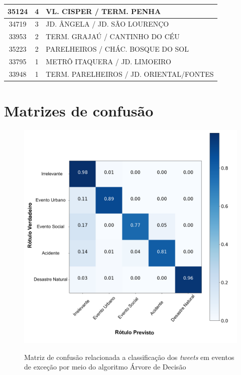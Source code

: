 \documentclass[
	12pt,				%
	oneside,			%
	a4paper,			%
	english,			%
	brazil				%
	]{abntex2ppgsi}
\begin{document}
{{\begin{apendicesenv}
\begin{longtable}{c|c|p{7cm}}
    35124 & 4     & VL. CISPER / TERM. PENHA \\
\hline

    34719 & 3     & JD. ÂNGELA / JD. SÃO LOURENÇO \\
\hline

    33953 & 2     & TERM. GRAJAÚ / CANTINHO DO CÉU \\
\hline

    35223 & 2     & PARELHEIROS / CHÁC. BOSQUE DO SOL \\
\hline

    33795 & 1     & METRÔ ITAQUERA / JD. LIMOEIRO \\
\hline

    33948 & 1     & TERM. PARELHEIROS / JD. ORIENTAL/FONTES \\
\hline


\end{longtable}

\normalsize

\chapter{Matrizes de confusão}
\label{apendiceE}

\begin{figure}[!htb]
	\centering
 	  \caption{Matriz de confusão relacionada a classificação dos \textit{tweets} em eventos de exceção por meio do algoritmo Árvore de Decisão}
		\includegraphics[width=1\linewidth]{images/confusion_matrix_dt_pt.png}
	\label{fig:confusion_matrix_dt}
\end{figure}


\end{apendicesenv}}}
\end{document}
